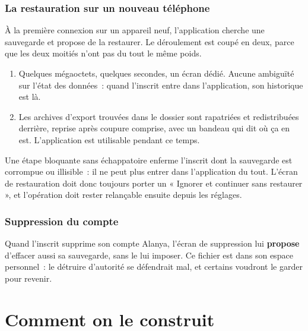 \documentclass[11pt,a4paper,oneside]{report}
\begin{document}
\section{La restauration sur un nouveau téléphone}
\label{ch:restauration}

À la première connexion sur un appareil neuf, l'application cherche une sauvegarde et
propose de la restaurer. Le déroulement est coupé en deux, parce que les deux moitiés n'ont
pas du tout le même poids.

\begin{enumerate}[leftmargin=*]
  \item {} Quelques mégaoctets, quelques secondes, un écran
        dédié. Aucune ambiguïté sur l'état des données~: quand l'inscrit entre dans
        l'application, son historique est là.
  \item {} Les archives d'export trouvées dans le dossier
         sont rapatriées et redistribuées derrière, reprise après coupure
        comprise, avec un bandeau qui dit où ça en est. L'application est utilisable pendant
        ce temps.
\end{enumerate}

\begin{alerte}
Une étape bloquante sans échappatoire enferme l'inscrit dont la sauvegarde est corrompue ou
illisible~: il ne peut plus entrer dans l'application du tout. L'écran de restauration doit
donc toujours porter un « Ignorer et continuer sans restaurer », et l'opération doit rester
relançable ensuite depuis les réglages.
\end{alerte}

\section{Suppression du compte}

Quand l'inscrit supprime son compte Alanya, l'écran de suppression lui \textbf{propose}
d'effacer aussi sa sauvegarde, sans le lui imposer. Ce fichier est dans son espace
personnel~: le détruire d'autorité se défendrait mal, et certains voudront le garder pour
revenir.

\part{Comment on le construit}
\end{document}
